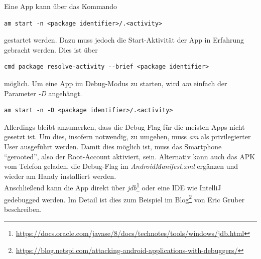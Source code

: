 			Eine App kann über das Kommando
			\begin{lstlisting}
am start -n <package identifier>/.<activity>
			\end{lstlisting}
			gestartet werden. Dazu muss jedoch die Start-Aktivität der App in Erfahrung gebracht werden. Dies ist über
			\begin{lstlisting}
cmd package resolve-activity --brief <package identifier>
			\end{lstlisting}
			möglich. Um eine App im Debug-Modus zu starten, wird \textit{am} einfach der Parameter \textit{-D} angehängt.
			\begin{lstlisting}
am start -n -D <package identifier>/.<activity>
			\end{lstlisting}
			Allerdings bleibt anzumerken, dass die Debug-Flag für die meisten Apps nicht gesetzt ist. Um dies, insofern notwendig, zu umgehen, muss \textit{am}	als privilegierter User ausgeführt werden. Damit dies möglich ist, muss das Smartphone "`gerooted"', also der Root-Account aktiviert, sein. Alternativ kann auch das APK vom Telefon geladen, die Debug-Flag im \textit{AndroidManifest.xml} ergänzen und wieder am Handy installiert werden.\\
			
			Anschließend kann die App direkt über \textit{jdb}\footnote{\url{https://docs.oracle.com/javase/8/docs/technotes/tools/windows/jdb.html}} oder eine IDE wie IntelliJ gedebugged werden. Im Detail ist dies zum Beispiel im Blog\footnote{\url{https://blog.netspi.com/attacking-android-applications-with-debuggers/}} von Eric Gruber beschreiben.\\
			
			
			
